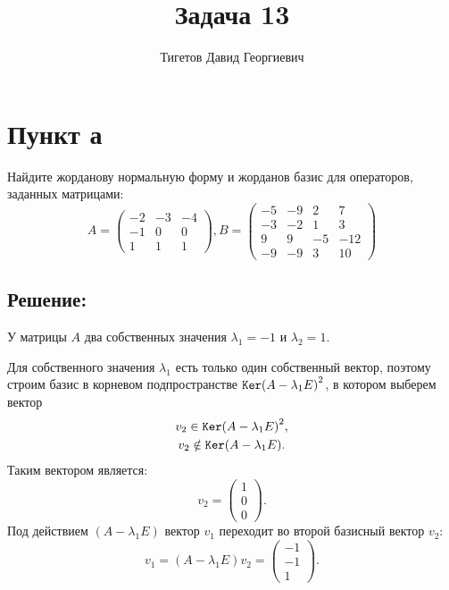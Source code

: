 \documentclass[12pt]{article}
\begin{document}
    \title{Задача 13}
    \author{Тигетов Давид Георгиевич}
    \date{}
    \maketitle

    \section*{Пункт а}
    Найдите жорданову нормальную форму и жорданов базис для операторов, заданных матрицами:
    \[
        A =
        \begin{pmatrix}
            -2 & -3 & -4 \\
            -1 & 0  & 0  \\
            1  & 1  & 1
        \end{pmatrix},
        B =
        \begin{pmatrix}
            -5 & -9 & 2  & 7   \\
            -3 & -2 & 1  & 3   \\
            9  & 9  & -5 & -12 \\
            -9 & -9 & 3  & 10
        \end{pmatrix}
    \]

    \subsection*{Решение:}
    У матрицы $A$ два собственных значения $\lambda_1 = -1$ и $\lambda_2 = 1$.

    Для собственного значения $\lambda_1$ есть только один собственный вектор, поэтому строим базис в корневом подпространстве $\mathtt{Ker}{\left ( A - \lambda_1 E \right)^2}$, в котором
    выберем вектор
    \begin{gather*}
        v_2 \in \mathtt{Ker}{\left ( A - \lambda_1 E \right)^2}, \\
        v_2 \notin \mathtt{Ker}{\left ( A - \lambda_1 E \right)}.
    \end{gather*}
    Таким вектором является:
    \[
        v_2 = \begin{pmatrix}
                  1 \\ 0 \\ 0
        \end{pmatrix}.
    \]
    Под действием $\left ( A - \lambda_1 E \right )$ вектор $v_1$ переходит во второй базисный вектор $v_2$:
    \[
        v_1
        = \left ( A - \lambda_1 E \right ) v_2
        = \begin{pmatrix}
              -1 \\ -1 \\ 1
        \end{pmatrix}.
    \]
\end{document}
